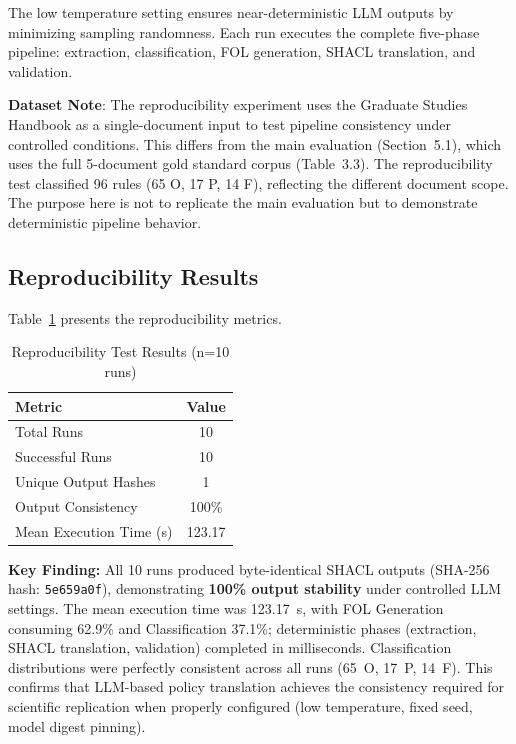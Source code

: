 The low temperature setting ensures near-deterministic LLM outputs by minimizing sampling randomness. Each run executes the complete five-phase pipeline: extraction, classification, FOL generation, SHACL translation, and validation.

\textbf{Dataset Note}: The reproducibility experiment uses the Graduate Studies Handbook as a single-document input to test pipeline consistency under controlled conditions. This differs from the main evaluation (Section~5.1), which uses the full 5-document gold standard corpus (Table~3.3). The reproducibility test classified 96 rules (65 O, 17 P, 14 F), reflecting the different document scope. The purpose here is not to replicate the main evaluation but to demonstrate deterministic pipeline behavior.

\subsection{Reproducibility Results}

Table~\ref{tab:reproducibility-metrics} presents the reproducibility metrics.

\begin{table}[htbp]
\centering
\caption{Reproducibility Test Results (n=10 runs)}
\label{tab:reproducibility-metrics}
\begin{tabular}{lc}
\toprule
\textbf{Metric} & \textbf{Value} \\
\midrule
Total Runs & 10 \\
Successful Runs & 10 \\
Unique Output Hashes & 1 \\
Output Consistency & 100\% \\
Mean Execution Time (s) & 123.17 \\
\bottomrule
\end{tabular}
\end{table}

\textbf{Key Finding:} All 10 runs produced byte-identical SHACL outputs (SHA-256 hash: \texttt{5e659a0f}), demonstrating \textbf{100\% output stability} under controlled LLM settings. The mean execution time was 123.17~s, with FOL Generation consuming 62.9\% and Classification 37.1\%; deterministic phases (extraction, SHACL translation, validation) completed in milliseconds. Classification distributions were perfectly consistent across all runs (65~O, 17~P, 14~F). This confirms that LLM-based policy translation achieves the consistency required for scientific replication when properly configured (low temperature, fixed seed, model digest pinning).

